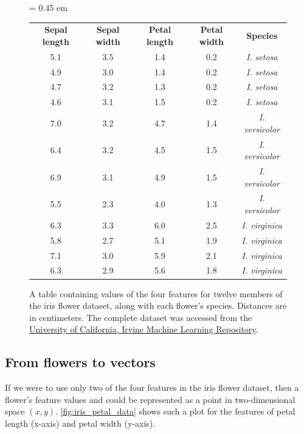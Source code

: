 \begin{figure}[h]
\centering
\tabcolsep = 0.45 em
\mySfFamily
{}
\begin{tabular}{c c c c c}
\rowcolor{gray!50}
\textbf{Sepal length} & \textbf{Sepal width} & \textbf{Petal length} & \textbf{Petal width} & \textbf{Species} \\
5.1 & 3.5 & 1.4 & 0.2 & \textit{I. setosa} \\
4.9 & 3.0 & 1.4 & 0.2 & \textit{I. setosa} \\
4.7 & 3.2 & 1.3 & 0.2 & \textit{I. setosa} \\
4.6 & 3.1 & 1.5 & 0.2 & \textit{I. setosa} \\
7.0 & 3.2 & 4.7 & 1.4 & \textit{I. versicolor} \\
6.4 & 3.2 & 4.5 & 1.5 & \textit{I. versicolor} \\
6.9 & 3.1 & 4.9 & 1.5 & \textit{I. versicolor} \\
5.5 & 2.3 & 4.0 & 1.3 & \textit{I. versicolor} \\
6.3 & 3.3 & 6.0 & 2.5 & \textit{I. virginica} \\
5.8 & 2.7 & 5.1 & 1.9 & \textit{I. virginica} \\
7.1 & 3.0 & 5.9 & 2.1 & \textit{I. virginica} \\
6.3 & 2.9 & 5.6 & 1.8 & \textit{I. virginica} \\
\end{tabular}
\caption{A table containing values of the four features for twelve members of the iris flower dataset, along with each flower's species. Distances are in centimeters. The complete dataset was accessed from the \href{https://archive.ics.uci.edu/ml/datasets/iris}{University of California, Irvine Machine Learning Repository}.}
\label{fig:iris_feature_table}
\end{figure}

\begin{qbox}\end{qbox}

\FloatBarrier
{}
\subsection{From flowers to vectors}

If we were to use only two of the four features in the iris flower dataset, then a flower's feature values  and  could be represented as a point in two-dimensional space $(x, y)$. \autoref{fig:iris_petal_data} shows such a plot for the features of petal length (x-axis) and petal width (y-axis).

